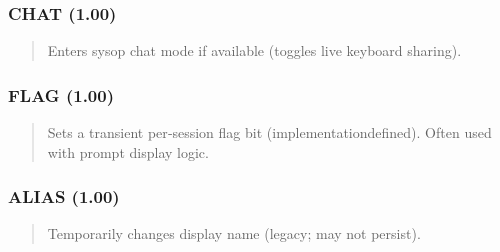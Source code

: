 \documentclass[letterpaper,10pt,english]{sphinxmanual}
\begin{document}
\subsubsection{CHAT (1.00)}
\label{\detokenize{ppl:chat-1-00}}\begin{quote}

\sphinxAtStartPar
{}
\begin{description}
\sphinxAtStartPar
Enters sysop chat mode if available (toggles live keyboard sharing).

\end{description}
\end{quote}


\subsubsection{FLAG (1.00)}
\label{\detokenize{ppl:flag-1-00}}\begin{quote}

\sphinxAtStartPar
{}
\begin{description}
\sphinxAtStartPar
Sets a transient per‑session flag bit (implementation\sphinxhyphen{}defined). Often used with prompt display logic.

\end{description}
\end{quote}


\subsubsection{ALIAS (1.00)}
\label{\detokenize{ppl:alias-1-00}}\begin{quote}

\sphinxAtStartPar
{}
\begin{description}
\sphinxAtStartPar
Temporarily changes display name (legacy; may not persist).

\end{description}
\end{quote}
\end{document}

